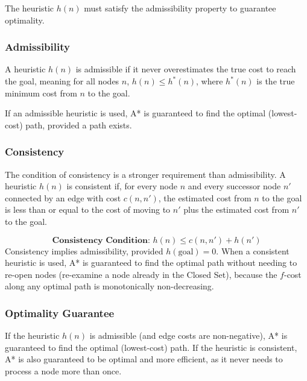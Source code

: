 The heuristic $h(n)$ must satisfy the admissibility property to guarantee optimality.

\subsubsection{Admissibility}
A heuristic $h(n)$ is admissible if it never overestimates the true cost to reach the goal, meaning for all nodes $n$, $h(n) \le h^*(n)$, where $h^*(n)$ is the true minimum cost from $n$ to the goal.

If an admissible heuristic is used, A* is guaranteed to find the optimal (lowest-cost) path, provided a path exists.



\subsubsection{Consistency}
The condition of consistency is a stronger requirement than admissibility. A heuristic $h(n)$ is consistent if, for every node $n$ and every successor node $n'$ connected by an edge with cost $c(n, n')$, the estimated cost from $n$ to the goal is less than or equal to the cost of moving to $n'$ plus the estimated cost from $n'$ to the goal.

$$\textbf{Consistency Condition: } h(n) \le c(n, n') + h(n')$$
Consistency implies admissibility, provided $h(\text{goal}) = 0$. When a consistent heuristic is used, A* is guaranteed to find the optimal path without needing to re-open nodes (re-examine a node already in the Closed Set), because the $f$-cost along any optimal path is monotonically non-decreasing.

\subsubsection{Optimality Guarantee}
If the heuristic $h(n)$ is admissible (and edge costs are non-negative), A* is guaranteed to find the optimal (lowest-cost) path. If the heuristic is consistent, A* is also guaranteed to be optimal and more efficient, as it never needs to process a node more than once.


